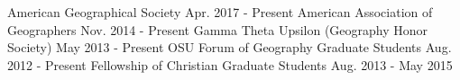 \begin{cvmemberships}
  \cvmembership
    {\hspace{-3 em}}
    {American Geographical Society}
    {\hspace{-2 em} Apr. 2017 - Present}
    {} %
  \cvmembership
    {\hspace{-3 em}}
    {American Association of Geographers}
    {Nov. 2014 - Present}
    {} %
  \cvmembership
    {\hspace{-3 em}}
    {Gamma Theta Upsilon (Geography Honor Society)}
    {May 2013 - Present}
    {} %
  \cvmembership
    {\hspace{-3 em}}
    {OSU Forum of Geography Graduate Students}
    {Aug. 2012 - Present}
    {} %
  \cvmembership
    {\hspace{-3 em}}
    {Fellowship of Christian Graduate Students}
    {\hspace{-2 em} Aug. 2013 - May 2015}
    {} %
\end{cvmemberships}
